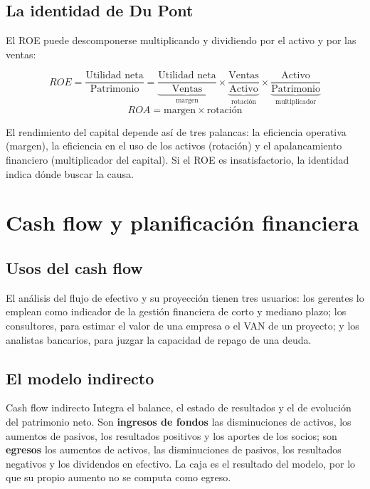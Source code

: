 \subsection{La identidad de Du Pont}

El ROE puede descomponerse multiplicando y dividiendo por el activo y por las ventas:

\begin{formulaBox}
\[
ROE = \frac{\text{Utilidad neta}}{\text{Patrimonio}}
= \underbrace{\frac{\text{Utilidad neta}}{\text{Ventas}}}_{\text{margen}}
\times \underbrace{\frac{\text{Ventas}}{\text{Activo}}}_{\text{rotación}}
\times \underbrace{\frac{\text{Activo}}{\text{Patrimonio}}}_{\text{multiplicador}}
\]
\[
ROA = \text{margen}\times\text{rotación}
\]
\end{formulaBox}

El rendimiento del capital depende así de tres palancas: la eficiencia operativa (margen), la eficiencia en el uso de los activos (rotación) y el apalancamiento financiero (multiplicador del capital). Si el ROE es insatisfactorio, la identidad indica dónde buscar la causa.

\section{Cash flow y planificación financiera}\label{sec:u2-cashflow}

\subsection{Usos del cash flow}

El análisis del flujo de efectivo y su proyección tienen tres usuarios: los gerentes lo emplean como indicador de la gestión financiera de corto y mediano plazo; los consultores, para estimar el valor de una empresa o el VAN de un proyecto; y los analistas bancarios, para juzgar la capacidad de repago de una deuda.

\subsection{El modelo indirecto}

\begin{definicion}{Cash flow indirecto}
Integra el balance, el estado de resultados y el de evolución del patrimonio neto. Son \textbf{ingresos de fondos} las disminuciones de activos, los aumentos de pasivos, los resultados positivos y los aportes de los socios; son \textbf{egresos} los aumentos de activos, las disminuciones de pasivos, los resultados negativos y los dividendos en efectivo. La caja es el resultado del modelo, por lo que su propio aumento no se computa como egreso.
\end{definicion}

